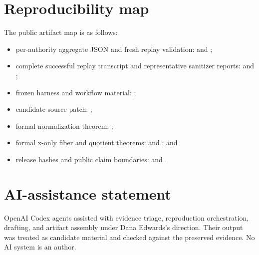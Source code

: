 \documentclass[11pt]{article}
\begin{document}
\section{Reproducibility map}

The public artifact map is as follows:

\begin{sloppypar}
\begin{itemize}
  \item per-authority aggregate JSON and fresh replay validation:
     and
    ;
  \item complete successful replay transcript and representative sanitizer
    reports:  and
    ;
  \item frozen harness and workflow material:
    ;
  \item candidate source patch:
    ;
  \item formal normalization theorem:
    ;
  \item formal x-only fiber and quotient theorems:
     and
    ; and
  \item release hashes and public claim boundaries:
     and .
\end{itemize}
\end{sloppypar}

\section*{AI-assistance statement}

OpenAI Codex agents assisted with evidence triage, reproduction orchestration,
drafting, and artifact assembly under Dana Edwards's direction.  Their output
was treated as candidate material and checked against the preserved evidence.
No AI system is an author.



\end{document}
